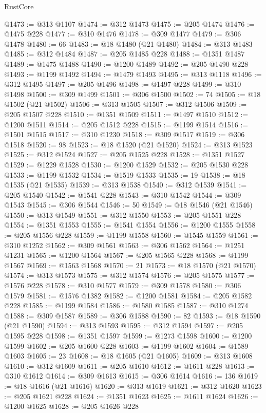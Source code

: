 \begin{lexlean}{RustCore}
\begin{coremodule}
@1473 := @313 @1107
@1474 := @312 @1473
@1475 := @205 @1474
@1476 := @1475 @228
@1477 := @310 @1476
@1478 := @309 @1477
@1479 := @306 @1478
@1480 := 66
@1483 := @18 @1480 (@21 @1480)
@1484 := @313 @1483
@1485 := @312 @1484
@1487 := @205 @1485 @228
@1488 := @1351 @1487
@1489 := @1475 @1488
@1490 := @1200 @1489
@1492 := @205 @1490 @228
@1493 := @1199 @1492
@1494 := @1479 @1493
@1495 := @313 @1118
@1496 := @312 @1495
@1497 := @205 @1496
@1498 := @1497 @228
@1499 := @310 @1498
@1500 := @309 @1499
@1501 := @306 @1500
@1502 := 74
@1505 := @18 @1502 (@21 @1502)
@1506 := @313 @1505
@1507 := @312 @1506
@1509 := @205 @1507 @228
@1510 := @1351 @1509
@1511 := @1497 @1510
@1512 := @1200 @1511
@1514 := @205 @1512 @228
@1515 := @1199 @1514
@1516 := @1501 @1515
@1517 := @310 @1230
@1518 := @309 @1517
@1519 := @306 @1518
@1520 := 98
@1523 := @18 @1520 (@21 @1520)
@1524 := @313 @1523
@1525 := @312 @1524
@1527 := @205 @1525 @228
@1528 := @1351 @1527
@1529 := @1229 @1528
@1530 := @1200 @1529
@1532 := @205 @1530 @228
@1533 := @1199 @1532
@1534 := @1519 @1533
@1535 := 19
@1538 := @18 @1535 (@21 @1535)
@1539 := @313 @1538
@1540 := @312 @1539
@1541 := @205 @1540
@1542 := @1541 @228
@1543 := @310 @1542
@1544 := @309 @1543
@1545 := @306 @1544
@1546 := 50
@1549 := @18 @1546 (@21 @1546)
@1550 := @313 @1549
@1551 := @312 @1550
@1553 := @205 @1551 @228
@1554 := @1351 @1553
@1555 := @1541 @1554
@1556 := @1200 @1555
@1558 := @205 @1556 @228
@1559 := @1199 @1558
@1560 := @1545 @1559
@1561 := @310 @1252
@1562 := @309 @1561
@1563 := @306 @1562
@1564 := @1251 @1231
@1565 := @1200 @1564
@1567 := @205 @1565 @228
@1568 := @1199 @1567
@1569 := @1563 @1568
@1570 := 21
@1573 := @18 @1570 (@21 @1570)
@1574 := @313 @1573
@1575 := @312 @1574
@1576 := @205 @1575
@1577 := @1576 @228
@1578 := @310 @1577
@1579 := @309 @1578
@1580 := @306 @1579
@1581 := @1576 @1382
@1582 := @1200 @1581
@1584 := @205 @1582 @228
@1585 := @1199 @1584
@1586 := @1580 @1585
@1587 := @310 @1274
@1588 := @309 @1587
@1589 := @306 @1588
@1590 := 82
@1593 := @18 @1590 (@21 @1590)
@1594 := @313 @1593
@1595 := @312 @1594
@1597 := @205 @1595 @228
@1598 := @1351 @1597
@1599 := @1273 @1598
@1600 := @1200 @1599
@1602 := @205 @1600 @228
@1603 := @1199 @1602
@1604 := @1589 @1603
@1605 := 23
@1608 := @18 @1605 (@21 @1605)
@1609 := @313 @1608
@1610 := @312 @1609
@1611 := @205 @1610
@1612 := @1611 @228
@1613 := @310 @1612
@1614 := @309 @1613
@1615 := @306 @1614
@1616 := 136
@1619 := @18 @1616 (@21 @1616)
@1620 := @313 @1619
@1621 := @312 @1620
@1623 := @205 @1621 @228
@1624 := @1351 @1623
@1625 := @1611 @1624
@1626 := @1200 @1625
@1628 := @205 @1626 @228

\end{coremodule}
\end{lexlean}
